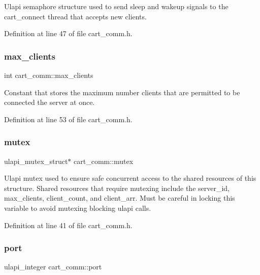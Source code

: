 Ulapi semaphore structure used to send sleep and wakeup signals to the cart\+\_\+connect thread that accepts new clients. 

Definition at line 47 of file cart\+\_\+comm.\+h.

\mbox{\label{classcart__comm_aaba30e6cd9bf524718862b8171dec9b3}} 
\subsubsection{\texorpdfstring{max\+\_\+clients}{max\_clients}}
{\footnotesize\ttfamily int cart\+\_\+comm\+::max\+\_\+clients\hspace{0.3cm}{\ttfamily [private]}}

Constant that stores the maximum number clients that are permitted to be connected the server at once. 

Definition at line 53 of file cart\+\_\+comm.\+h.

\mbox{\label{classcart__comm_a02a98a6ee6885d5521590db05650ad41}} 
\subsubsection{\texorpdfstring{mutex}{mutex}}
{\footnotesize\ttfamily ulapi\+\_\+mutex\+\_\+struct$\ast$ cart\+\_\+comm\+::mutex\hspace{0.3cm}{\ttfamily [private]}}

Ulapi mutex used to ensure safe concurrent access to the shared resources of this structure. Shared resources that require mutexing include the server\+\_\+id, max\+\_\+clients, client\+\_\+count, and client\+\_\+arr. Must be careful in locking this variable to avoid mutexing blocking ulapi calls. 

Definition at line 41 of file cart\+\_\+comm.\+h.

\mbox{\label{classcart__comm_ac280d2562b45d4f21187f95d573b454a}} 
\subsubsection{\texorpdfstring{port}{port}}
{\footnotesize\ttfamily ulapi\+\_\+integer cart\+\_\+comm\+::port\hspace{0.3cm}{\ttfamily [private]}}

